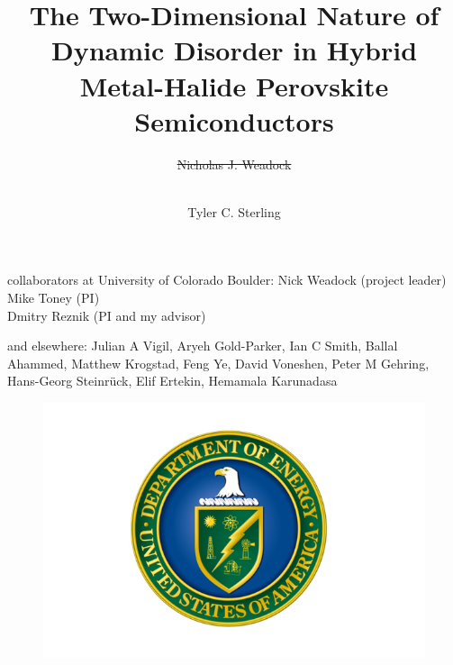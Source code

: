 \documentclass[12pt]{beamer}
\title{The Two-Dimensional Nature of Dynamic Disorder in Hybrid
Metal-Halide Perovskite Semiconductors}
\author{\sout{Nicholas J. Weadock} \and \\ Tyler C. Sterling}
\date{}
\begin{document}
{


\begin{frame}
\vspace{-1cm}
\titlepage
\end{frame}


\begin{frame} %


\begin{block}{collaborators at University of Colorado Boulder:}
{\color{blue}Nick Weadock (project leader) \\
Mike Toney (PI) \\
Dmitry Reznik (PI and my advisor)}
\end{block}

\vspace{1cm}
\begin{block}{and elsewhere:}
Julian A Vigil, Aryeh Gold-Parker, Ian C Smith, Ballal Ahammed, Matthew Krogstad, Feng Ye, David Voneshen, Peter M Gehring, Hans-Georg Steinrück, Elif Ertekin, Hemamala Karunadasa
\end{block}
\end{frame}


\begin{frame} %

\begin{figure}
    \includegraphics[scale=0.2]{figs/doe_logo.png}
\end{figure}


\end{frame}}
\end{document}

